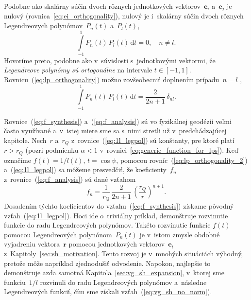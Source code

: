 \documentclass[a4paper,12pt]{book}
\newcommand{\diff}{\mathrm d}
\let\vec\mathbf
\begin{document}
Podobne ako skalárny súčin dvoch rôznych jednotkových vektorov~$\vec e_i$ 
a~$ \vec e_j$ je nulový (rovnica~\ref{eq:ei_orthogonality}), nulový je 
i~skalárny súčin dvoch rôznych Legendreovych polynómov~$P_n(t)$ a~$P_l(t)$,
%
\begin{equation}
\label{eq:lp_orthogonality}
\int\limits_{-1}^1 P_n(t) \, P_l(t) \, \diff t = 0{,} \quad n \neq l{.}
\end{equation}
%
Hovoríme preto, podobne ako v~súvislosti s~jednotkovými vektormi, že
\emph{Legendreove polynómy sú ortogonálne} na intervale $t \in [-1, 1].$
Rovnicu~(\ref{eq:lp_orthogonality}) možno zovšeobecniť doplnením prípadu~$n
= l$ \parencite[napríklad][]{Hobson},
%
\begin{equation}
\label{eq:lp_orthogonality_2}
\int\limits_{-1}^1 P_n(t) \, P_l(t) \, \diff t = \frac{2}{2n + 1} \, 
\delta_{nl}{.}
\end{equation}

Rovnice~(\ref{eq:f_synthesis}) a~(\ref{eq:f_analysis}) sú vo fyzikálnej
geodézii veľmi často využívané a~v~istej miere sme sa s~nimi stretli už
v~predchádzajúcej kapitole.  Nech~$r$ a~$r_Q$ z~rovnice~(\ref{eq:1l_legpol}) sú 
konštanty, pre ktoré platí~$r > r_Q$ (pozri podmienku
$\alpha < 1$ v~rovnici~\ref{eq:generic_function_for_lps}).  Keď označíme $f(t)
= 1 \slash l(t)$, $t = \cos\psi$, pomocou rovníc~(\ref{eq:lp_orthogonality_2})
a~(\ref{eq:1l_legpol}) sa môžeme presvedčiť, že koeficienty~$f_n$
z~rovnice~(\ref{eq:f_analysis}) sú dané vzťahom
%
\begin{equation}
f_n = \frac{1}{r_Q} \, \frac{2}{2n + 1} \, \left( \frac{r_Q}{r} \right)^{n
+ 1}{.}
\end{equation}
%
Dosadením týchto koeficientov do vzťahu~(\ref{eq:f_synthesis}) získame pôvodný 
vzťah~(\ref{eq:1l_legpol}).  Hoci ide o~triviálny príklad, demonštruje 
rozvinutie funkcie do radu Legendreových polynómov.  Takéto rozvinutie funkcie 
$f(t)$ pomocou Legendreových polynónom~$P_n(t)$ je v~istom zmysle obdobné 
vyjadreniu vektora~$\vec r$ pomocou jednotkových vektorov~$\vec e_i$ 
z~Kapitoly~\ref{sec:sh_motivation}.  Tento rozvoj je v~mnohých situáciách 
výhodný, pretože môže napríklad zjednodušiť odvodenie.  Napokon, najlepšie to 
demonštruje azda samotná Kapitola~\ref{sec:vg_sh_expansion}, v~ktorej sme 
funkciu~$1 \slash l$ rozvinuli do radu Legendreových polynómov a~následne 
Legendreových funkcií, čím sme získali vzťah~(\ref{eq:vg_sh_no_norm}).
\end{document}
